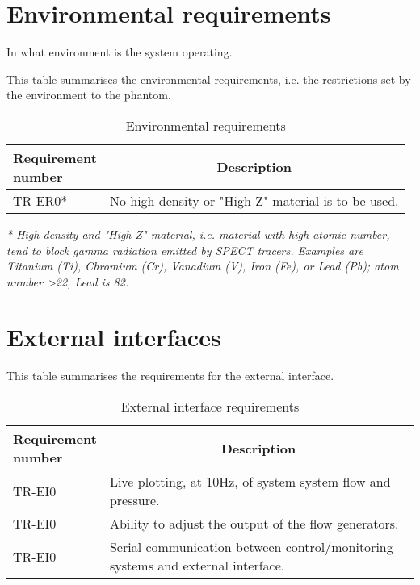 \section{Environmental requirements}
In what environment is the system operating.
\begin{table} [H]
\caption{Environmental requirements}
\label{tab:envirreq}
This table summarises the environmental requirements, i.e. the restrictions set by the environment to the phantom.
\begin{tabular}{l|p{120mm}|}
	\makecell[l]{\textbf{Requirement} \\ \textbf{number}} & \multicolumn{1}{c}{\textbf{Description}}\\
	\hline
	TR-ER0* &  No high-density or "High-Z" material is to be used.\\ 
	\cline{2-2}
\end{tabular}
\raggedright
\textit{* High-density and "High-Z" material, i.e. material with high atomic number, tend to block gamma radiation emitted by \ac{SPECT} tracers. Examples are Titanium (Ti), Chromium (Cr), Vanadium (V), Iron (Fe), or Lead (Pb); atom number \textgreater 22, Lead is 82.}
\end{table}

\section{External interfaces}
\begin{table} [H]
\caption{External interface requirements}
\label{tab:exint}
This table summarises the requirements for the external interface.
\begin{tabular}{l|p{120mm}|}
	\makecell[l]{\textbf{Requirement} \\ \textbf{number}} & \multicolumn{1}{c}{\textbf{Description}}\\
	\hline
	TR-EI0 &  Live plotting, at 10Hz, of system system flow and pressure.\\
	TR-EI0 & Ability to adjust the output of the flow generators. \\
	TR-EI0 & Serial communication between control/monitoring systems and external interface.\\
	\cline{2-2}
\end{tabular}
\end{table}

